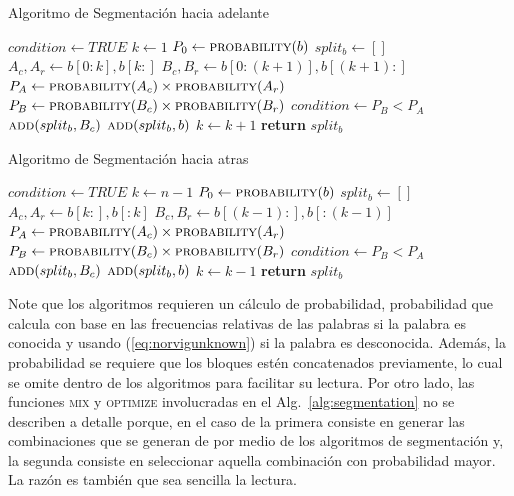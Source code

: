 \begin{megaalgorithm}[h]
	\caption{Algoritmo de Segmentación hacia adelante}
	\begin{algorithmic}[1]
		\State $condition\gets TRUE$
		\State $k\gets 1$
		\State $P_0\gets \mbox{\textsc{probability}}(b)$
		\State $split_b \gets []$
		\State $A_c, A_r \gets b[0:k],b[k:]$
		\State $B_c, B_r \gets b[0:(k+1)],b[(k+1):]$
		\State $P_A \gets \mbox{\textsc{probability}}(A_c) \times \mbox{\textsc{probability}}(A_r)$
		\State $P_B \gets \mbox{\textsc{probability}}(B_c) \times \mbox{\textsc{probability}}(B_r)$
		\State $condition \gets P_B < P_A$
		\State $\mbox{\textsc{add}}(split_b, B_c)$
		\State $\mbox{\textsc{add}}(split_b, b)$
		\EndIf
		\State $k \gets k+1$
		\EndWhile
		\State \textbf{return} $split_b$
		\EndProcedure
	\end{algorithmic}
\end{megaalgorithm}

\begin{megaalgorithm}[h]
	\caption{Algoritmo de Segmentación hacia atras}
	\begin{algorithmic}[1]
		\State $condition\gets TRUE$
		\State $k\gets n-1$ 
		\State $P_0\gets \mbox{\textsc{probability}}(b)$
		\State $split_b \gets []$
		\State $A_c, A_r \gets b[k:],b[:k]$
		\State $B_c, B_r \gets b[(k-1):],b[:(k-1)]$
		\State $P_A \gets \mbox{\textsc{probability}}(A_c) \times \mbox{\textsc{probability}}(A_r)$
		\State $P_B \gets \mbox{\textsc{probability}}(B_c) \times \mbox{\textsc{probability}}(B_r)$
		\State $condition \gets P_B < P_A$
		\State $\mbox{\textsc{add}}(split_b, B_c)$
		\State $\mbox{\textsc{add}}(split_b, b)$
		\EndIf
		\State $k \gets k-1$
		\EndWhile
		\State \textbf{return} $split_b$
		\EndProcedure
	\end{algorithmic}
\end{megaalgorithm}

Note que los algoritmos requieren un cálculo de probabilidad, probabilidad que calcula con base en las frecuencias relativas de las palabras si la palabra es conocida y usando (\ref{eq:norvigunknown}) si la palabra es desconocida. Además, la probabilidad se requiere que los bloques estén concatenados previamente, lo cual se omite dentro de los algoritmos para facilitar su lectura. Por otro lado, las funciones \textsc{mix} y \textsc{optimize} involucradas en el Alg.~\ref{alg:segmentation} no se describen a detalle porque, en el caso de la primera consiste en generar las combinaciones que se generan de por medio de los algoritmos de segmentación y, la segunda consiste en seleccionar aquella combinación con probabilidad mayor. La razón es también que sea sencilla la lectura.
  
